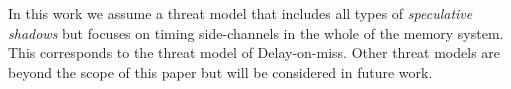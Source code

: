 In this work we assume a threat model that includes all types of \emph{speculative shadows} but focuses on timing side-channels in the whole of the memory system. This corresponds to the threat model of Delay-on-miss. Other threat models are beyond the scope of this paper but will be considered in future work. %







